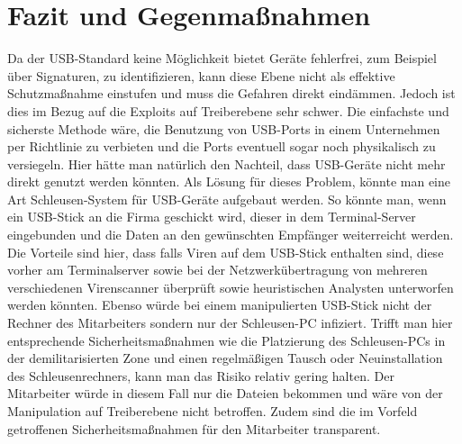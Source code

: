 \chapter{Fazit und Gegenmaßnahmen}
Da der USB-Standard keine Möglichkeit bietet Geräte fehlerfrei, zum Beispiel über Signaturen, zu identifizieren, kann diese Ebene nicht als effektive Schutzmaßnahme einstufen und muss die Gefahren direkt eindämmen. Jedoch ist dies im Bezug auf die Exploits auf Treiberebene sehr schwer. Die einfachste und sicherste Methode wäre, die Benutzung von USB-Ports in einem Unternehmen per Richtlinie zu verbieten und die Ports eventuell sogar noch physikalisch zu versiegeln. Hier hätte man natürlich den Nachteil, dass USB-Geräte nicht mehr direkt genutzt werden könnten. Als Lösung für dieses Problem, könnte man eine Art Schleusen-System für USB-Geräte aufgebaut werden. So könnte man, wenn ein USB-Stick an die Firma geschickt wird, dieser in dem Terminal-Server eingebunden und die Daten an den gewünschten Empfänger weiterreicht werden. Die Vorteile sind hier, dass falls Viren auf dem USB-Stick enthalten sind, diese vorher am Terminalserver sowie bei der Netzwerkübertragung von mehreren verschiedenen Virenscanner überprüft sowie heuristischen Analysten unterworfen werden könnten. Ebenso würde bei einem manipulierten USB-Stick nicht der Rechner des Mitarbeiters sondern nur der Schleusen-PC infiziert. Trifft man hier entsprechende Sicherheitsmaßnahmen wie die Platzierung des Schleusen-PCs in der demilitarisierten Zone und einen regelmäßigen Tausch oder Neuinstallation des Schleusenrechners, kann man das Risiko relativ gering halten. Der Mitarbeiter würde in diesem Fall nur die Dateien bekommen und wäre von der Manipulation auf Treiberebene nicht betroffen. Zudem sind die im Vorfeld getroffenen Sicherheitsmaßnahmen für den Mitarbeiter transparent.